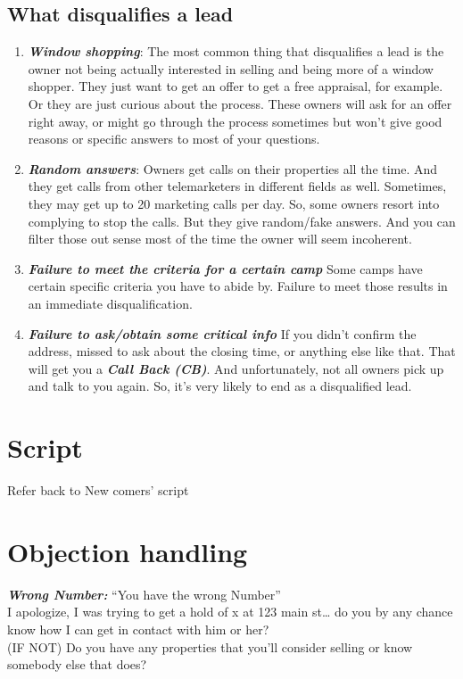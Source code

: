 \documentclass[12pt]{article}
\newcommand{\bb}[1]{\textbf{\textit{#1}}}
\newcommand{\bowner}[1]{{\noindent\color{red} #1}}
\begin{document}
\subsection{What disqualifies a lead}
    \vspace{1em}
\begin{enumerate}[label= \roman*.]
    \item \bb{Window shopping}:
    The most common thing that disqualifies a lead is the owner not being actually interested in selling and being more of a window shopper. They just want to get an offer to get a free appraisal, for example. Or they are just curious about the process. These owners will ask for an offer right away, or might go through the process sometimes but won't give good reasons or specific answers to most of your questions.

    \item \bb{Random answers}:
    Owners get calls on their properties all the time. And they get calls from other telemarketers in different fields as well. Sometimes, they may get up to 20 marketing calls per day. So, some owners resort into complying to stop the calls. But they give random/fake answers. And you can filter those out sense most of the time the owner will seem incoherent.

    \item \bb{Failure to meet the criteria for a certain camp}
    Some camps have certain specific criteria you have to abide by. Failure to meet those results in an immediate disqualification.

    \item \bb{Failure to ask/obtain some critical info}
    If you didn't confirm the address, missed to ask about the closing time, or anything else like that. That will get you a \bb{Call Back (CB)}. And unfortunately, not all owners pick up and talk to you again. So, it's very likely to end as a disqualified lead.

\end{enumerate}

\newpage

\section{Script}
Refer back to {\color{blue} New comers' script}

\section{Objection handling}
\bowner{\bb{Wrong Number:} “You have the wrong Number”} \\
I apologize, I was trying to get a hold of x at 123 main st… do you by any chance know how I can get in contact with him or her? \\
(IF NOT)
Do you have any properties that you’ll consider selling or know somebody else that does?
\end{document}
